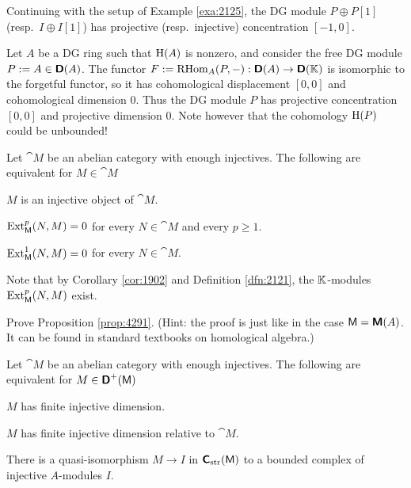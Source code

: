 \begin{exa} \label{exa:2127}
Continuing with the setup of Example \ref{exa:2125}, the DG module
$P \oplus P[1]$ (resp.\ $I \oplus I[1]$) has projective (resp.\ injective)
concentration $[-1, 0]$.
\end{exa}

\begin{exa} \label{exa:2128}
Let $A$ be a DG ring such that $\operatorname{H}(A)$ is nonzero, and consider the free 
DG module $P := A \in \boldsymbol{\mathsf{D}}(A)$.
The functor 
$F := \operatorname{RHom}_{A}(P, -) : \boldsymbol{\mathsf{D}}(A) \to \boldsymbol{\mathsf{D}}(\mathbb{K})$ 
is isomorphic to the forgetful functor, so it has cohomological displacement 
$[0, 0]$ and cohomological dimension $0$.
Thus the DG module $P$ has projective concentration $[0, 0]$ and projective 
dimension $0$.
Note however that the cohomology $\operatorname{H}(P)$ could be unbounded! 
\end{exa}

\begin{prop} \label{prop:4291} 
Let $\cat{M}$ be an abelian category with enough injectives. The following are 
equivalent for $M \in \cat{M}$~\tup{:}
\begin{enumerate} [itemsep=0.3ex]
 $M$ is an injective object of $\cat{M}$.

 $\operatorname{Ext}^{p}_{\operatorname{\mathsf{M}}}(N, M) = 0$ for every 
$N \in \cat{M}$ and every $p \geq 1$. 

  $\operatorname{Ext}^1_{\operatorname{\mathsf{M}}}(N, M) = 0$ for every 
$N \in \cat{M}$. 
\end{enumerate}
\end{prop}

Note that by Corollary \ref{cor:1902} and Definition \ref{dfn:2121}, the 
$\mathbb{K}$-modules $\operatorname{Ext}^p_{\operatorname{\mathsf{M}}}(N, M)$ exist.

\begin{exer} \label{exer:4291}
Prove Proposition \ref{prop:4291}. (Hint: the proof is just like in the case 
$\operatorname{\mathsf{M}} = \boldsymbol{\mathsf{M}}(A)$. It can be found in standard textbooks on homological 
algebra.)
\end{exer}

\begin{prop} \label{prop:2115}
Let $\cat{M}$ be an abelian category with enough injectives. The following are 
equivalent for $M \in \boldsymbol{\mathsf{D}}^+(\operatorname{\mathsf{M}})$~\tup{:}
\begin{enumerate}
 $M$ has finite injective dimension.

 $M$ has finite injective dimension relative to $\cat{M}$.

 There is a quasi-isomorphism $M \to I$ in 
$\boldsymbol{\mathsf{C}}_{\mathrm{str}}(\operatorname{\mathsf{M}})$ 
to a bounded complex of injective $A$-modules $I$.
\end{enumerate}
\end{prop}

